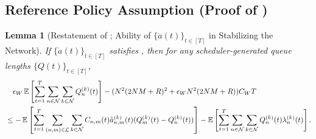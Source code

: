 \documentclass[11pt,fullpage,letterpaper]{article} %
\newtheorem{lemma}[theorem]{Lemma}
\renewcommand{\bm}[1]{#1}%
\newcommand{\E}{\operatornamewithlimits{\mathbb{E}}}
\newcommand{\mN}{{\mathcal N}}
\newcommand{\mL}{{\mathcal L}}
\begin{document}
\subsection{Reference Policy Assumption (Proof of )}\label{sec:multi-hop stability network stability appendix}
\begin{lemma}[Restatement of ; Ability of $\{\mathring{\bm a}(t)\}_{t\in [T]}$ in Stabilizing the Network]
If $\{\mathring{\bm a}(t)\}_{t\in [T]}$ satisfies , then for any scheduler-generated queue lengths $\{\bm Q(t)\}_{t\in [T]}$,
\begin{align*}
&\quad \epsilon_W \E\left [\sum_{t=1}^T \sum_{n\in \mN} \sum_{k\in \mN} Q_n^{(k)}(t)\right ] - (N^2 (2NM+R)^2 + \epsilon_W N^2 (2NM+R)) C_W T \\
&\le-\E\left [\sum_{t=1}^T \sum_{(n,m)\in \mL} \sum_{k\in \mN} C_{n,m}(t) \mathring{a}_{n,m}^{(k)}(t) (Q_m^{(k)}(t) - Q_n^{(k)}(t))\right ]-\E\left [\sum_{t=1}^T \sum_{n\in \mN} \sum_{k\in \mN} Q_n^{(k)}(t) \lambda_n^{(k)}(t)\right ].
\end{align*}
\end{lemma}
\end{document}
